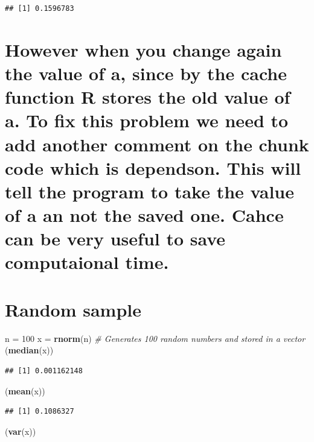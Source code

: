 \documentclass[]{article}
\newenvironment{Shaded}{\begin{snugshade}}{\end{snugshade}}
\newcommand{\KeywordTok}[1]{\textcolor[rgb]{0.13,0.29,0.53}{\textbf{#1}}}
\newcommand{\DecValTok}[1]{\textcolor[rgb]{0.00,0.00,0.81}{#1}}
\newcommand{\StringTok}[1]{\textcolor[rgb]{0.31,0.60,0.02}{#1}}
\newcommand{\CommentTok}[1]{\textcolor[rgb]{0.56,0.35,0.01}{\textit{#1}}}
\newcommand{\NormalTok}[1]{#1}
\begin{document}
\begin{verbatim}
## [1] 0.1596783
\end{verbatim}

\section{However when you change again the value of a, since by the
cache function R stores the old value of a. To fix this problem we need
to add another comment on the chunk code which is dependson. This will
tell the program to take the value of a an not the saved one. Cahce can
be very useful to save computaional
time.}\label{however-when-you-change-again-the-value-of-a-since-by-the-cache-function-r-stores-the-old-value-of-a.-to-fix-this-problem-we-need-to-add-another-comment-on-the-chunk-code-which-is-dependson.-this-will-tell-the-program-to-take-the-value-of-a-an-not-the-saved-one.-cahce-can-be-very-useful-to-save-computaional-time.}

\section{Random sample}\label{random-sample}

\begin{Shaded}
\begin{Highlighting}[]
\NormalTok{n =}\StringTok{ }\DecValTok{100}
\NormalTok{x =}\StringTok{ }\KeywordTok{rnorm}\NormalTok{(n) }\CommentTok{# Generates 100 random numbers and stored in a vector}
\NormalTok{(}\KeywordTok{median}\NormalTok{(x))}
\end{Highlighting}
\end{Shaded}

\begin{verbatim}
## [1] 0.001162148
\end{verbatim}

\begin{Shaded}
\begin{Highlighting}[]
\NormalTok{(}\KeywordTok{mean}\NormalTok{(x))}
\end{Highlighting}
\end{Shaded}

\begin{verbatim}
## [1] 0.1086327
\end{verbatim}

\begin{Shaded}
\begin{Highlighting}[]
\NormalTok{(}\KeywordTok{var}\NormalTok{(x))}
\end{Highlighting}
\end{Shaded}
\end{document}
